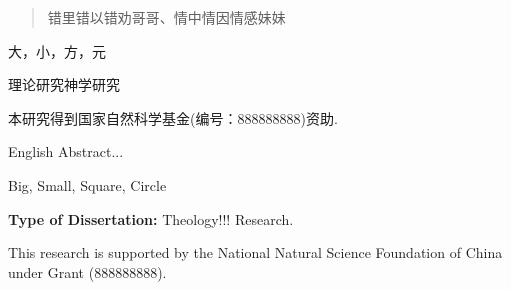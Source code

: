\fancyhead[C]{\leftmark}
\fancyhead[CO]{\leftmark} %

\begin{abstract}
错里错以错劝哥哥、情中情因情感妹妹
\end{abstract}

\begin{keywords}
大，小，方，元
\end{keywords}

\vspace{\baselineskip} %
\noindent %
{}理论研究神学研究

\vspace{1.5\baselineskip} %
\noindent %
本研究得到国家自然科学基金(编号：888888888)资助.
\cleardoublepage

\begin{englishabstract}
English Abstract...
\end{englishabstract}

\begin{englishkeywords}
Big, Small, Square, Circle
\end{englishkeywords}

\vspace{\baselineskip} %
\noindent %
\textbf{Type of Dissertation: }Theology!!! Research.

\vspace{1.5\baselineskip} %
\noindent %
This research is supported by the National Natural Science Foundation of China under Grant (888888888).
\cleardoublepage

